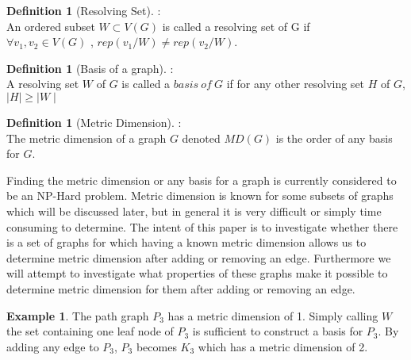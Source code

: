 \documentclass[11pt]{amsart}
\theoremstyle{plain}  %
\theoremstyle{definition}
\newtheorem{defin}[thm]{{Definition}}
\newtheorem{ex}[thm]{Example}
\theoremstyle{remark}
\numberwithin{equation}{thm}
\begin{document}
 \begin{defin}[Resolving Set]:\\
  An ordered subset $W \subset V(G)$ is called a resolving set of G if\\ $\forall v_1, v_2 \in V(G)$  , $rep(v_1/W) \neq  rep(v_2/W)$.
 \end{defin}
 
 \begin{defin}[Basis of a graph]:\\
  A resolving set $W$ of $G$ is called a $basis\ of\ G$ if for any other resolving set $H$ of $G$, $\mid H\mid \geq \mid W\mid$
 \end{defin}
 
 \begin{defin}[Metric Dimension]:\\
  The metric dimension of a graph $G$ denoted $MD(G)$ is the order of any basis for $G$.
 \end{defin}


Finding the metric dimension or any basis for a graph is currently considered to be an NP-Hard problem. 
Metric dimension is known for some subsets of graphs which will be discussed later, but in general it is very difficult or simply time consuming to determine.
The intent of this paper is to investigate whether there is a set of graphs for which having a known metric dimension allows us to determine metric dimension after adding or removing an edge.
Furthermore we will attempt to investigate what properties of these graphs make it possible to determine metric dimension for them after adding or removing an edge.
\begin{ex}
 The path graph $P_3$ has a metric dimension of 1. Simply calling $W$ the set containing one leaf node of $P_3$ is sufficient to construct a basis for $P_3$.
 By adding any edge to $P_3$, $P_3$ becomes $K_3$ which has a metric dimension of 2.
\end{ex}

\end{document}
